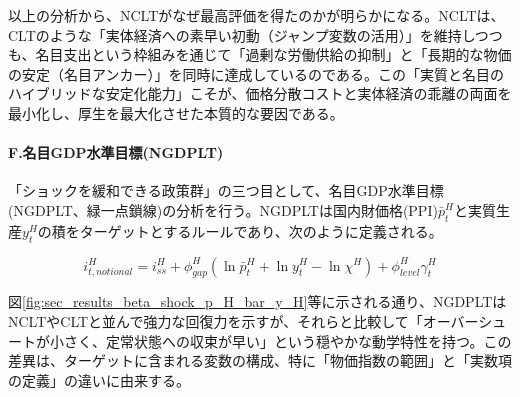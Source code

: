 以上の分析から、NCLTがなぜ最高評価を得たのかが明らかになる。NCLTは、CLTのような「実体経済への素早い初動（ジャンプ変数の活用）」を維持しつつも、名目支出という枠組みを通じて「過剰な労働供給の抑制」と「長期的な物価の安定（名目アンカー）」を同時に達成しているのである。この「実質と名目のハイブリッドな安定化能力」こそが、価格分散コストと実体経済の乖離の両面を最小化し、厚生を最大化させた本質的な要因である。

\paragraph{F.名目GDP水準目標(NGDPLT)}\label{sec:sec_results_beta_shock_analysis_ngdplt}
「ショックを緩和できる政策群」の三つ目として、名目GDP水準目標(NGDPLT、緑一点鎖線)の分析を行う。NGDPLTは国内財価格(PPI)\(\bar{p}_t^H\)と実質生産\(y_t^H\)の積をターゲットとするルールであり、次のように定義される。

\begin{equation}
i_{t,notional}^H=i_{ss}^H+\phi_{gap}^H(\ln\bar{p}_t^H+\ln y_t^H-\ln\chi^H)+\phi_{level}^H\gamma_t^H
\label{form:sec_results_beta_shock_analysis_ngdplt_policy}
\end{equation}

図\ref{fig:sec_results_beta_shock_p_H_bar_y_H}等に示される通り、NGDPLTはNCLTやCLTと並んで強力な回復力を示すが、それらと比較して「オーバーシュートが小さく、定常状態への収束が早い」という穏やかな動学特性を持つ。この差異は、ターゲットに含まれる変数の構成、特に「物価指数の範囲」と「実数項の定義」の違いに由来する。

